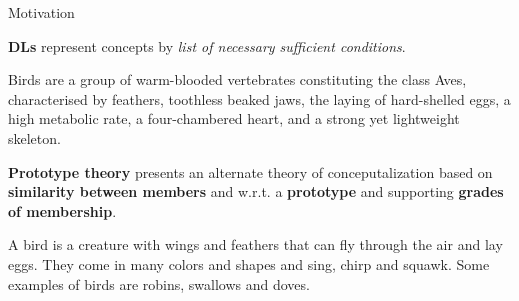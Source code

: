 \documentclass[10pt, xcolor=dvipsnames]{beamer}
\begin{document}
\begin{frame}[fragile]{Motivation}

\textbf{DLs} represent concepts by \emph{list of necessary sufficient conditions}.

\medskip 


{\footnotesize Birds are a group of warm-blooded vertebrates constituting the class Aves, characterised by feathers, toothless beaked jaws, the laying of hard-shelled eggs, a high metabolic rate, a four-chambered heart, and a strong yet lightweight skeleton.} 

\bigskip \pause

\textbf{Prototype theory} presents an alternate theory of conceputalization based on \textbf{similarity between members} and w.r.t. a \textbf{prototype} and supporting \textbf{grades of membership}.

\medskip

{\footnotesize A bird is a creature with wings and feathers that can fly through the air and lay eggs. They come in many colors and shapes and sing, chirp and squawk. Some examples of birds are robins, swallows and doves.}


\end{frame}

\end{document}
